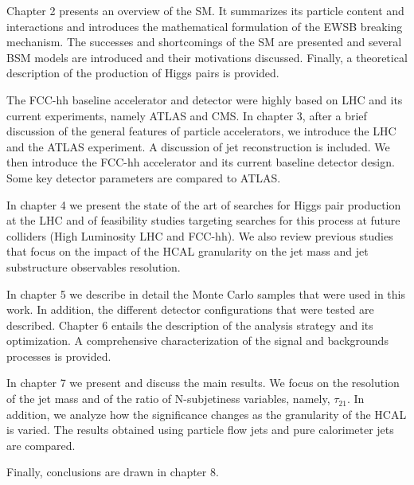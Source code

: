 Chapter 2 presents an overview of the SM. It summarizes its particle content and interactions and introduces the mathematical formulation of the EWSB breaking mechanism. The successes and shortcomings of the SM are presented and several BSM models are introduced and their motivations discussed. Finally, a theoretical description of the production of Higgs pairs is provided.

The FCC-hh baseline accelerator and detector were highly based on LHC and its current experiments, namely ATLAS and CMS. In chapter 3, after a brief discussion of the general features of particle accelerators, we introduce the LHC and the ATLAS experiment. A discussion of jet reconstruction is included. We then introduce the FCC-hh accelerator and its current baseline detector design. Some key detector parameters are compared to ATLAS.

In chapter 4 we present the state of the art of searches for Higgs pair production at the LHC and of feasibility studies targeting searches for this process at future colliders (High Luminosity LHC and FCC-hh). We also review previous studies that focus on the impact of the HCAL granularity on the jet mass and jet substructure observables resolution.

In chapter 5 we describe in detail the Monte Carlo samples that were used in this work. In addition, the different detector configurations that were tested are described. Chapter 6 entails the description of the analysis strategy and its optimization. A comprehensive characterization of the signal and backgrounds processes is provided. 

In chapter 7 we present and discuss the main results. We focus on the resolution of the jet mass and of the ratio of N-subjetiness variables, namely, $\tau_{21}$. In addition, we analyze how the significance changes as the granularity of the HCAL is varied. The results obtained using particle flow jets and pure calorimeter jets are compared.

Finally, conclusions are drawn in chapter 8.


